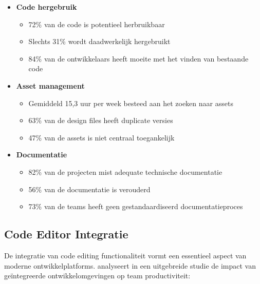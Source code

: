 \begin{itemize}
    \item \textbf{Code hergebruik}
    \begin{itemize}
        \item 72\% van de code is potentieel herbruikbaar
        \item Slechts 31\% wordt daadwerkelijk hergebruikt
        \item 84\% van de ontwikkelaars heeft moeite met het vinden van bestaande code
    \end{itemize}
    
    \item \textbf{Asset management}
    \begin{itemize}
        \item Gemiddeld 15,3 uur per week besteed aan het zoeken naar assets
        \item 63\% van de design files heeft duplicate versies
        \item 47\% van de assets is niet centraal toegankelijk
    \end{itemize}
    
    \item \textbf{Documentatie}
    \begin{itemize}
        \item 82\% van de projecten mist adequate technische documentatie
        \item 56\% van de documentatie is verouderd
        \item 73\% van de teams heeft geen gestandaardiseerd documentatieproces
    \end{itemize}
\end{itemize}

\subsection{Code Editor Integratie}
\label{subsec:code-editor}

De integratie van code editing functionaliteit vormt een essentieel aspect van moderne ontwikkelplatforms. \textcite{Patel2023} analyseert in een uitgebreide studie de impact van geïntegreerde ontwikkelomgevingen op team productiviteit:

